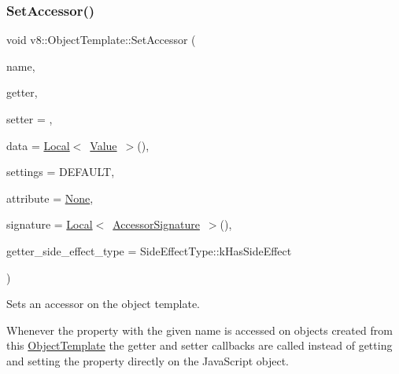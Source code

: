 \subsubsection{\texorpdfstring{Set\+Accessor()}{SetAccessor()}}
{\footnotesize\ttfamily void v8\+::\+Object\+Template\+::\+Set\+Accessor (\begin{DoxyParamCaption}\item[{\mbox{\hyperlink{classv8_1_1Local}{Local}}$<$ \mbox{\hyperlink{classv8_1_1String}{String}} $>$}]{name,  }\item[{\mbox{\hyperlink{namespacev8_a722613c87061708a4f1aa050d095f868}{Accessor\+Getter\+Callback}}}]{getter,  }\item[{Accessor\+Setter\+Callback}]{setter = {},  }\item[{\mbox{\hyperlink{classv8_1_1Local}{Local}}$<$ \mbox{\hyperlink{classv8_1_1Value}{Value}} $>$}]{data = {\ttfamily \mbox{\hyperlink{classv8_1_1Local}{Local}}$<$~\mbox{\hyperlink{classv8_1_1Value}{Value}}~$>$()},  }\item[{\mbox{\hyperlink{namespacev8_a31d8355cb043d7d2dda3f4a52760b64e}{Access\+Control}}}]{settings = {\ttfamily DEFAULT},  }\item[{\mbox{\hyperlink{namespacev8_a05f25f935e108a1ea2d150e274602b87}{Property\+Attribute}}}]{attribute = {\ttfamily \mbox{\hyperlink{namespacev8_a05f25f935e108a1ea2d150e274602b87a7ab4d58719c33b3ea2dfaefa29b111df}{None}}},  }\item[{\mbox{\hyperlink{classv8_1_1Local}{Local}}$<$ \mbox{\hyperlink{classv8_1_1AccessorSignature}{Accessor\+Signature}} $>$}]{signature = {\ttfamily \mbox{\hyperlink{classv8_1_1Local}{Local}}$<$~\mbox{\hyperlink{classv8_1_1AccessorSignature}{Accessor\+Signature}}~$>$()},  }\item[{\mbox{\hyperlink{namespacev8_a29711319c2b9fc7716d65faee2f7b9cb}{Side\+Effect\+Type}}}]{getter\+\_\+side\+\_\+effect\+\_\+type = {\ttfamily SideEffectType\+:\+:kHasSideEffect} }\end{DoxyParamCaption})}

Sets an accessor on the object template.

Whenever the property with the given name is accessed on objects created from this \mbox{\hyperlink{classv8_1_1ObjectTemplate}{Object\+Template}} the getter and setter callbacks are called instead of getting and setting the property directly on the Java\+Script object.


